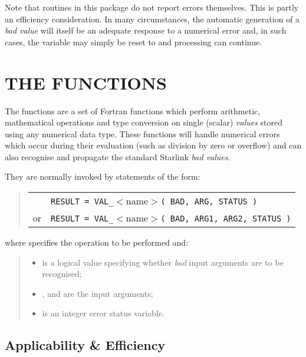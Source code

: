 Note that routines in this package do not report errors themselves.
This is partly an efficiency consideration.
In many circumstances, the automatic generation of a {\em bad value} will
itself be an adequate response to a numerical error and, in such cases, the
 variable may simply be reset to  and
processing can continue.

\section{THE  FUNCTIONS}

\label{section:val}

The  functions are a set of Fortran functions which perform
arithmetic, mathematical operations and type conversion on single (scalar)
{\em values} stored using any numerical data type.
These functions will handle numerical errors which occur during their
evaluation (such as division by zero or overflow) and can also recognise and
propagate the standard Starlink {\em bad values}.

They are normally invoked by statements of the form:

\begin{quote}
\begin{tabular}{rl}
& \verb#RESULT = VAL_#$<$name$>$\verb#( BAD, ARG, STATUS )#\\
or & \verb#RESULT = VAL_#$<$name$>$\verb#( BAD, ARG1, ARG2, STATUS )#
\end{tabular}
\end{quote}

where  specifies the operation to be performed and:

\begin{quote}
\begin{itemize}

\item {} is a logical value specifying whether {\em bad}
input arguments are to be recognised;

\item {},  and  are the input
arguments;

\item {} is an integer error status variable.

\end{itemize}
\end{quote}

\subsection{Applicability \& Efficiency}

